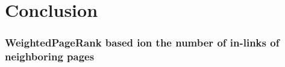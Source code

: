 \documentclass[conference]{IEEEtran}
\begin{document}
\section{Conclusion}

\subsubsection{WeightedPageRank based ion the number of in-links of neighboring pages}




\end{document}
